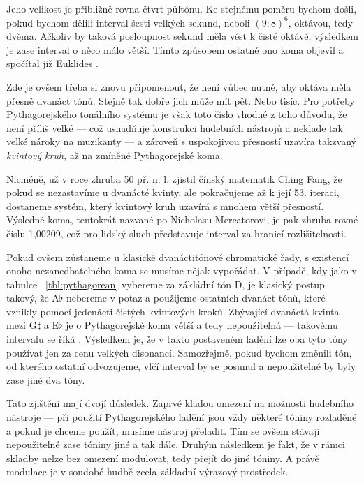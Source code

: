 \documentclass[12pt]{article}
\begin{document}
Jeho velikost je přibližně rovna čtvrt půltónu. Ke stejnému poměru bychom došli, pokud bychom dělili interval šesti velkých sekund, neboli $(9 : 8)^6$, oktávou, tedy dvěma. Ačkoliv by taková posloupnost sekund měla vést k čisté oktávě, výsledkem je zase interval o něco málo větší. Tímto způsobem ostatně ono koma objevil a spočítal již Euklides \cite{barker}.

Zde je ovšem třeba si znovu připomenout, že není vůbec nutné, aby oktáva měla přesně dvanáct tónů. Stejně tak dobře jich může mít pět. Nebo tisíc. Pro potřeby Pythagorejského tonálního systému je však toto číslo vhodné z toho důvodu, že není příliš velké — což usnadňuje konstrukci hudebních nástrojů a neklade tak velké nároky na muzikanty — a zároveň s uspokojivou přesností uzavíra takzvaný \emph{kvintový kruh}, až na zmíněné Pythagorejské koma.

Nicméně, už v roce zhruba 50 př. n. l. zjistil čínský matematik Ching Fang, že pokud se nezastavíme u dvanácté kvinty, ale pokračujeme až k její 53. iteraci, dostaneme systém, který kvintový kruh uzavírá s mnohem větší přesností. Výsledné koma, tentokrát nazvané po Nicholasu Mercatorovi, je pak zhruba rovné číslu 1,00209, což pro lidský sluch představuje interval za hranicí rozlišitelnosti.

Pokud ovšem zůstaneme u klasické dvanáctitónové chromatické řady, s existencí onoho nezanedbatelného koma se musíme nějak vypořádat. V případě, kdy jako v tabulce ~\ref{tbl:pythagorean} vybereme za zákládní tón D, je klasický postup takový, že A$\flat$ nebereme v potaz a použijeme ostatních dvanáct tónů, které vznikly pomocí jedenácti čistých kvintových kroků. Zbývající dvanáctá kvinta mezi G$\sharp$ a E$\flat$ je o Pythagorejské koma větší a tedy nepoužitelná — takovému intervalu se říká . Výsledkem je, že v takto postaveném ladění lze oba tyto tóny používat jen za cenu velkých disonancí. Samozřejmě, pokud bychom změnili tón, od kterého ostatní odvozujeme, vlčí interval by se posunul a nepoužitelné by byly zase jiné dva tóny.

Tato zjištění mají dvojí důsledek. Zaprvé kladou omezení na možnosti hudebního nástroje — při použití Pythagorejského ladění jsou vždy některé tóniny rozladěné a pokud je chceme použít, musíme nástroj přeladit. Tím se ovšem stávají nepoužitelné zase tóniny jiné a tak dále. Druhým následkem je fakt, že v rámci skladby nelze bez omezení modulovat, tedy přejít do jiné tóniny. A právě modulace je v soudobé hudbě zcela základní výrazový prostředek.
\end{document}
